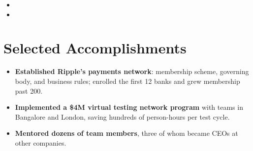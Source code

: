 \documentclass[11pt,letterpaper,sans]{moderncv}
\begin{document}
\begin{itemize}
\vspace{3pt}

\item{}

\vspace{3pt}

\item{}

\end{itemize}


\section{Selected Accomplishments}
\vspace{1pt}
\begin{itemize}
\item {\textbf{Established Ripple's payments network}: membership scheme, governing body, and business rules; enrolled the first 12 banks and grew membership past 200.}
\item {\textbf{Implemented a \$4M virtual testing network program} with teams in Bangalore and London, saving hundreds of person-hours per test cycle.}
\item {\textbf{Mentored dozens of team members}, three of whom became CEOs at other companies.}
\end{itemize}

\end{document}
